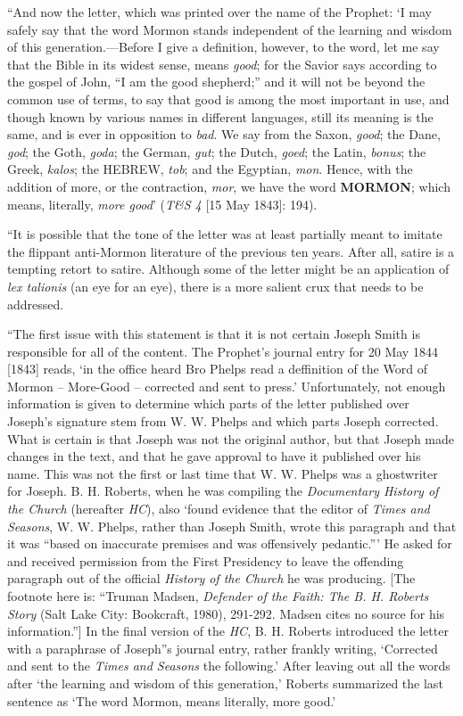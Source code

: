 			``And now the letter, which was printed over the name of the Prophet: `I may safely say that the word Mormon stands independent of the learning and wisdom of this generation.---Before I give a definition, however, to the word, let me say that the Bible in its widest sense, means \textit{good}; for the Savior says according to the gospel of John, ``I am the good shepherd;'' and it will not be beyond the common use of terms, to say that good is among the most important in use, and though known by various names in different languages, still its meaning is the same, and is ever in opposition to \textit{bad}. We say from the Saxon, \textit{good}; the Dane, \textit{god}; the Goth, \textit{goda}; the German, \textit{gut}; the Dutch, \textit{goed}; the Latin, \textit{bonus}; the Greek, \textit{kalos}; the \textsc{HEBREW}, \textit{tob}; and the Egyptian, \textit{mon}. Hence, with the addition of more, or the contraction, \textit{mor}, we have the word \textbf{\textsc{MORMON}}; which means, literally, \textit{more good}' (\textit{T\&S 4} [15 May 1843]: 194).

			``It is possible that the tone of the letter was at least partially meant to imitate the flippant anti-Mormon literature of the previous ten years. After all, satire is a tempting retort to satire. Although some of the letter might be an application of \textit{lex talionis} (an eye for an eye), there is a more salient crux that needs to be addressed.

			``The first issue with this statement is that it is not certain Joseph Smith is responsible for all of the content. The Prophet's journal entry for 20 May 1844 [1843] reads, `in the office heard Bro Phelps read a deffinition of the Word of Mormon -- More-Good -- corrected and sent to press.' Unfortunately, not enough information is given to determine which parts of the letter published over Joseph's signature stem from W. W. Phelps and which parts Joseph corrected. What is certain is that Joseph was not the original author, but that Joseph made changes in the text, and that he gave approval to have it published over his name. This was not the first or last time that W. W. Phelps was a ghostwriter for Joseph. B. H. Roberts, when he was compiling the \textit{Documentary History of the Church} (hereafter \textit{HC}), also `found evidence that the editor of \textit{Times and Seasons}, W. W. Phelps, rather than Joseph Smith, wrote this paragraph and that it was ``based on inaccurate premises and was offensively pedantic.''' He asked for and received permission from the First Presidency to leave the offending paragraph out of the official \textit{History of the Church} he was producing. [The footnote here is: ``Truman Madsen, \textit{Defender of the Faith: The B. H. Roberts Story} (Salt Lake City: Bookcraft, 1980), 291-292. Madsen cites no source for his information.''] In the final version of the \textit{HC}, B. H. Roberts introduced the letter with a paraphrase of Joseph''s journal entry, rather frankly writing, `Corrected and sent to the \textit{Times and Seasons} the following.' After leaving out all the words after `the learning and wisdom of this generation,' Roberts summarized the last sentence as `The word Mormon, means literally, more good.'

